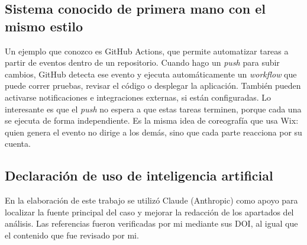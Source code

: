 \documentclass[11pt,a4paper]{article}
\begin{document}
\subsection*{Sistema conocido de primera mano con el mismo estilo}
Un ejemplo que conozco es GitHub Actions, que permite automatizar tareas a partir de eventos dentro de un repositorio. Cuando hago un \textit{push} para subir cambios, GitHub detecta ese evento y ejecuta automáticamente un \textit{workflow} que puede correr pruebas, revisar el código o desplegar la aplicación. También pueden activarse notificaciones e integraciones externas, si están configuradas. Lo interesante es que el \textit{push} no espera a que estas tareas terminen, porque cada una se ejecuta de forma independiente. Es la misma idea de coreografía que usa Wix: quien genera el evento no dirige a los demás, sino que cada parte reacciona por su cuenta.

\subsection*{Declaración de uso de inteligencia artificial}
En la elaboración de este trabajo se utilizó Claude (Anthropic) como apoyo para localizar la fuente principal del caso y mejorar la redacción de los apartados del análisis. Las referencias fueron verificadas por mi mediante sus DOI, al igual que el contenido que fue revisado por mi.

\printbibliography[title={Referencias}]
\end{document}
